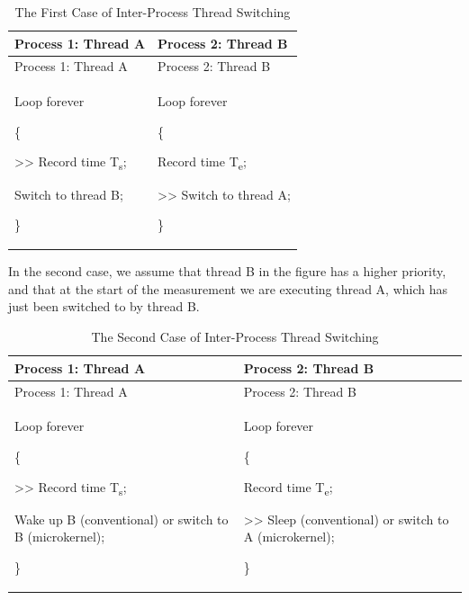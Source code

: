 \begin{xltabular}{\textwidth}{@{}>{\hsize\raggedright\arraybackslash}X>{\hsize\raggedright\arraybackslash}X@{}}
\caption{The First Case of Inter-Process Thread Switching}\label{tab:1-3-inter-process-thread-switch-case-1}\\
\toprule
Process 1: Thread A & Process 2: Thread B\tabularnewline
\endfirsthead
\toprule
Process 1: Thread A & Process 2: Thread B\tabularnewline
\midrule
\endhead
\bottomrule
\endlastfoot
Loop forever

\{

\textgreater\textgreater{} Record time T\textsubscript{s};

Switch to thread B;

\}\strut
 & Loop forever

\{

Record time T\textsubscript{e};

\textgreater\textgreater{} Switch to thread A;

\}\strut
\tabularnewline
\end{xltabular}
\nopagebreak[4]

In the second case, we assume that thread B in the figure has a higher priority, and that at the start of the measurement we are executing thread A, which has just been switched to by thread B.

\begin{xltabular}{\textwidth}{@{}>{\hsize\raggedright\arraybackslash}X>{\hsize\raggedright\arraybackslash}X@{}}
\caption{The Second Case of Inter-Process Thread Switching}\label{tab:1-4-inter-process-thread-switch-case-2}\\
\toprule
Process 1: Thread A & Process 2: Thread B\tabularnewline
\endfirsthead
\toprule
Process 1: Thread A & Process 2: Thread B\tabularnewline
\midrule
\endhead
\bottomrule
\endlastfoot
Loop forever

\{

\textgreater\textgreater{} Record time T\textsubscript{s};

Wake up B (conventional) or switch to B (microkernel);

\}\strut
 & Loop forever

\{

Record time T\textsubscript{e};

\textgreater\textgreater{} Sleep (conventional) or switch to A (microkernel);

\}\strut
\tabularnewline
\end{xltabular}
\nopagebreak[4]

